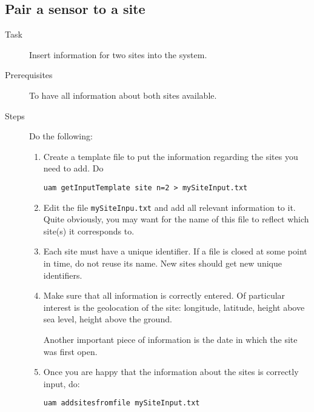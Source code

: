 \documentclass[12pt]{amsart}
\begin{document}
\subsection{Pair a sensor to a site}
\begin{description}
\item[Task] Insert information for two sites into the system.

\item[Prerequisites] To have all information about both sites available.

\item[Steps] Do the following:

\begin{enumerate}
\item Create a template file to put the information regarding the sites you need to add. Do

\begin{verbatim}
uam getInputTemplate site n=2 > mySiteInput.txt
\end{verbatim}

\item Edit the file  {\tt mySiteInpu.txt} and add all relevant information to it. Quite obviously, you may want for the name of this file to reflect which site(s) it corresponds to.

\item Each site must have a unique identifier. If a file is closed at some point in time, do not reuse its name. New sites should get new unique identifiers.

\item Make sure that all information is correctly entered. Of particular interest is the geolocation of the site: longitude, latitude, height above sea level, height above the ground.

Another important piece of information is the date in which the site was first open.

\item Once you are happy that the information about the sites is correctly input, do:

\begin{verbatim}
uam addsitesfromfile mySiteInput.txt
\end{verbatim}


\end{enumerate}
\end{description}
\end{document}
